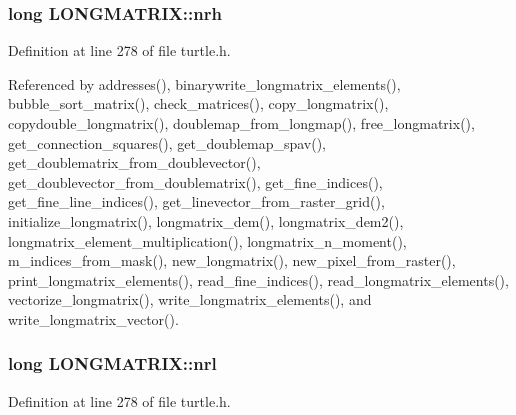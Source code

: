 \hypertarget{struct_l_o_n_g_m_a_t_r_i_x_a3e9b599ce3ff8e5359788c76c7d014f1}{
\subsubsection[{nrh}]{\setlength{\rightskip}{0pt plus 5cm}long L\-O\-N\-G\-M\-A\-T\-R\-I\-X\-::nrh}}\label{struct_l_o_n_g_m_a_t_r_i_x_a3e9b599ce3ff8e5359788c76c7d014f1}


Definition at line 278 of file turtle.\-h.



Referenced by addresses(), binarywrite\-\_\-longmatrix\-\_\-elements(), bubble\-\_\-sort\-\_\-matrix(), check\-\_\-matrices(), copy\-\_\-longmatrix(), copydouble\-\_\-longmatrix(), doublemap\-\_\-from\-\_\-longmap(), free\-\_\-longmatrix(), get\-\_\-connection\-\_\-squares(), get\-\_\-doublemap\-\_\-spav(), get\-\_\-doublematrix\-\_\-from\-\_\-doublevector(), get\-\_\-doublevector\-\_\-from\-\_\-doublematrix(), get\-\_\-fine\-\_\-indices(), get\-\_\-fine\-\_\-line\-\_\-indices(), get\-\_\-linevector\-\_\-from\-\_\-raster\-\_\-grid(), initialize\-\_\-longmatrix(), longmatrix\-\_\-dem(), longmatrix\-\_\-dem2(), longmatrix\-\_\-element\-\_\-multiplication(), longmatrix\-\_\-n\-\_\-moment(), m\-\_\-indices\-\_\-from\-\_\-mask(), new\-\_\-longmatrix(), new\-\_\-pixel\-\_\-from\-\_\-raster(), print\-\_\-longmatrix\-\_\-elements(), read\-\_\-fine\-\_\-indices(), read\-\_\-longmatrix\-\_\-elements(), vectorize\-\_\-longmatrix(), write\-\_\-longmatrix\-\_\-elements(), and write\-\_\-longmatrix\-\_\-vector().

\hypertarget{struct_l_o_n_g_m_a_t_r_i_x_ab31fdd3a6a40f30a2c6fc9abf045e6f9}{
\subsubsection[{nrl}]{\setlength{\rightskip}{0pt plus 5cm}long L\-O\-N\-G\-M\-A\-T\-R\-I\-X\-::nrl}}\label{struct_l_o_n_g_m_a_t_r_i_x_ab31fdd3a6a40f30a2c6fc9abf045e6f9}


Definition at line 278 of file turtle.\-h.



